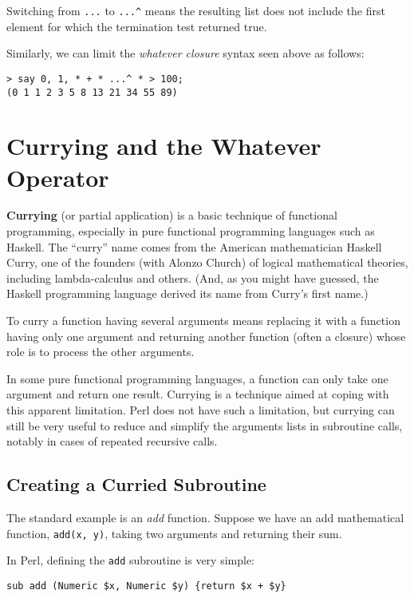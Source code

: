 Switching from \verb'...' to \verb'...^' means the 
resulting list does not include the first element 
for which the termination test returned true.

Similarly, we can limit the \emph{whatever closure} 
syntax seen above as follows:

\begin{verbatim}
> say 0, 1, * + * ...^ * > 100;
(0 1 1 2 3 5 8 13 21 34 55 89)
\end{verbatim}

\section{Currying and the Whatever Operator}

{\bf Currying} (or partial application) is a basic technique 
of functional programming, especially in pure functional 
programming languages such as Haskell. The ``curry'' name comes 
from the American mathematician Haskell Curry, one of the 
founders (with Alonzo Church) of logical mathematical 
theories, including lambda-calculus and others. (And, as 
you might have guessed, the Haskell programming language 
derived its name from Curry's first name.)

To curry a function having several arguments means replacing 
it with a function having only one argument and returning 
another function (often a closure) whose role is to 
process the other arguments.

In some pure functional programming languages, a function 
can only take one argument and return one result. Currying 
is a technique aimed at coping with this apparent limitation. 
Perl does not have such a limitation, but currying can still 
be very useful to reduce and simplify the arguments lists 
in subroutine calls, notably in cases of repeated recursive 
calls.


\subsection{Creating a Curried Subroutine}

The standard example is an \emph{add} function. Suppose 
we have an add mathematical function, \verb'add(x, y)', 
taking two arguments and returning their sum. 

In Perl, defining the {\tt add} subroutine is very simple:

\begin{verbatim}
sub add (Numeric $x, Numeric $y) {return $x + $y}
\end{verbatim}


